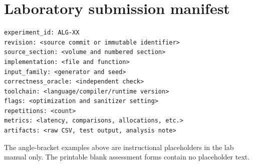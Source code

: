 \documentclass[11pt,letterpaper]{article}
\begin{document}
\section{Laboratory submission manifest}
\begin{lstlisting}
experiment_id: ALG-XX
revision: <source commit or immutable identifier>
source_section: <volume and numbered section>
implementation: <file and function>
input_family: <generator and seed>
correctness_oracle: <independent check>
toolchain: <language/compiler/runtime version>
flags: <optimization and sanitizer setting>
repetitions: <count>
metrics: <latency, comparisons, allocations, etc.>
artifacts: <raw CSV, test output, analysis note>
\end{lstlisting}
The angle-bracket examples above are instructional placeholders in the lab manual only. The printable blank assessment forms contain no placeholder text.
\end{document}
